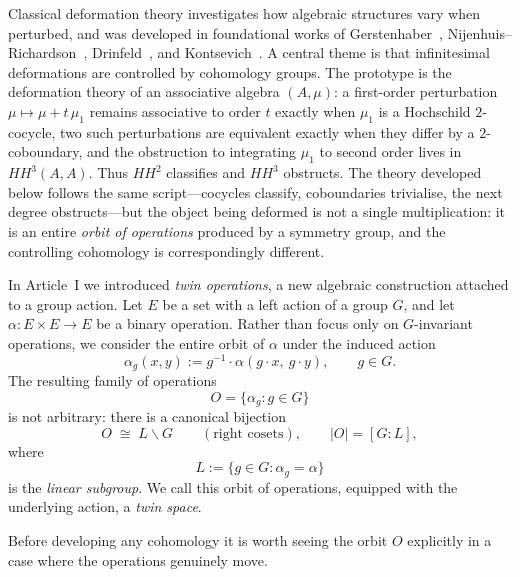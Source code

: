 \documentclass[11pt,a4paper]{article}
\numberwithin{equation}{section}
\newcommand{\TwinOrbit}{O}
\newcommand{\LinearSubgroup}{L}
\newcommand{\abs}[1]{\left\lvert #1 \right\rvert}
\begin{document}
	Classical deformation theory investigates how algebraic structures vary when perturbed,
	and was developed in foundational works of Gerstenhaber~\cite{Gerstenhaber1964},
	Nijenhuis--Richardson~\cite{NijenhuisRichardson1967},
	Drinfeld~\cite{Drinfeld1986}, and Kontsevich~\cite{Kontsevich2003}.
	A central theme is that infinitesimal deformations are controlled by cohomology groups. The prototype is the deformation theory of an associative algebra $(A,\mu)$: a first-order perturbation $\mu\mapsto\mu+t\,\mu_1$ remains associative to order $t$ exactly when $\mu_1$ is a Hochschild $2$-cocycle, two such perturbations are equivalent exactly when they differ by a $2$-coboundary, and the obstruction to integrating $\mu_1$ to second order lives in $HH^3(A,A)$. Thus $HH^2$ classifies and $HH^3$ obstructs. The theory developed below follows the same script---cocycles classify, coboundaries trivialise, the next degree obstructs---but the object being deformed is not a single multiplication: it is an entire \emph{orbit of operations} produced by a symmetry group, and the controlling cohomology is correspondingly different.
	
	In Article~I we introduced \emph{twin operations}, a new algebraic construction attached to a group action.
	Let $E$ be a set with a left action of a group $G$, and let $\alpha : E\times E \to E$ be a binary operation.
	Rather than focus only on $G$-invariant operations, we consider the entire orbit of $\alpha$ under the induced action
	\begin{equation}\label{eq:twin-def}
		\alpha_g(x,y) := g^{-1}\cdot \alpha(g\cdot x,\ g\cdot y), \qquad g\in G.
	\end{equation}
	The resulting family of operations
	\[
	\TwinOrbit = \{\alpha_g : g\in G\}
	\]
	is not arbitrary: there is a canonical bijection
	\[
	\TwinOrbit \;\cong\; \LinearSubgroup\backslash G \qquad(\text{right cosets}),\qquad \abs{\TwinOrbit}=[G:\LinearSubgroup],
	\]
	where 
	\[
	\LinearSubgroup := \{ g\in G : \alpha_g=\alpha \}
	\]
	is the \emph{linear subgroup}.  
	We call this orbit of operations, equipped with the underlying action, a \emph{twin space}.

	Before developing any cohomology it is worth seeing the orbit $\TwinOrbit$ explicitly in a case where the operations genuinely move.
\end{document}
